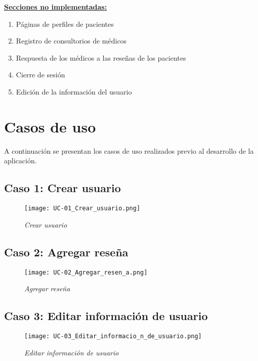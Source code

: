 \vspace{0.3 cm}

\textbf{\underline{Secciones no implementadas:}}

\begin{enumerate}
\item Páginas de perfiles de pacientes
\item Registro de consultorios de médicos
\item Respuesta de los médicos a las reseñas de los pacientes
\item Cierre de sesión
\item Edición de la información del usuario
\end{enumerate}

\section{Casos de uso}

A continuación se presentan los casos de uso realizados previo al desarrollo de la aplicación.

\subsection{Caso 1: Crear usuario}

\begin{figure}[H]
\centering
\texttt{[image: UC-01\_Crear\_usuario.png]}
\caption{\textit{Crear usuario}}
\end{figure}

\subsection{Caso 2: Agregar reseña}

\begin{figure}[H]
\centering
\texttt{[image: UC-02\_Agregar\_resen\_a.png]}
\caption{\textit{Agregar reseña}}
\end{figure}

\subsection{Caso 3: Editar información de usuario}

\begin{figure}[H]
\centering
\texttt{[image: UC-03\_Editar\_informacio\_n\_de\_usuario.png]}
\caption{\textit{Editar información de usuario}}
\end{figure}

